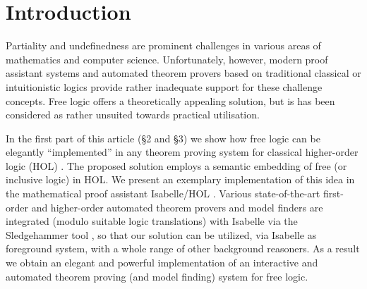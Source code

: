\section{Introduction}
\label{intro}
Partiality and undefinedness are prominent challenges in various areas
of mathematics and computer science.  Unfortunately, however, modern
proof assistant systems and automated theorem provers based on
traditional classical or intuitionistic logics provide rather
inadequate support for these challenge concepts.  Free logic offers a
theoretically appealing solution, but is has been considered as rather
unsuited towards practical utilisation.


In the first part of this article (\S2 and \S3) we show how free logic
can be elegantly ``implemented'' in any theorem proving system for
classical higher-order logic (HOL) \cite{B5}. The proposed solution
employs a semantic embedding of free (or inclusive logic) in HOL. We
present an exemplary implementation of this idea in the mathematical
proof assistant Isabelle/HOL \cite{NPW02}. Various state-of-the-art
first-order and higher-order automated theorem provers and model
finders are integrated (modulo suitable logic translations) with
Isabelle via the Sledgehammer tool \cite{Sledgehammer}, so that our
solution can be utilized, via Isabelle as foreground system, with a
whole range of other background reasoners. As a result we obtain an
elegant and powerful implementation of an interactive and automated
theorem proving (and model finding) system for free logic.





 
